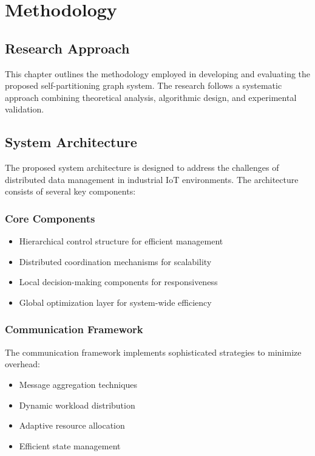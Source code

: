 \chapter{Methodology}

\section{Research Approach}
This chapter outlines the methodology employed in developing and evaluating the proposed self-partitioning graph system. The research follows a systematic approach combining theoretical analysis, algorithmic design, and experimental validation.

\section{System Architecture}
The proposed system architecture is designed to address the challenges of distributed data management in industrial IoT environments. The architecture consists of several key components:

\subsection{Core Components}
\begin{itemize}
    \item Hierarchical control structure for efficient management
    \item Distributed coordination mechanisms for scalability
    \item Local decision-making components for responsiveness
    \item Global optimization layer for system-wide efficiency
\end{itemize}

\subsection{Communication Framework}
The communication framework implements sophisticated strategies to minimize overhead:
\begin{itemize}
    \item Message aggregation techniques
    \item Dynamic workload distribution
    \item Adaptive resource allocation
    \item Efficient state management
\end{itemize}

